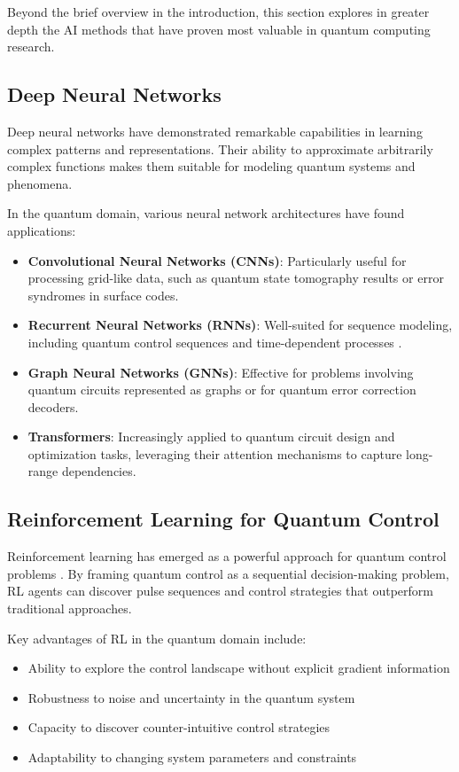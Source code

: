 Beyond the brief overview in the introduction, this section explores in greater depth the AI methods that have proven most valuable in quantum computing research.

\subsection{Deep Neural Networks}
Deep neural networks have demonstrated remarkable capabilities in learning complex patterns and representations. Their ability to approximate arbitrarily complex functions \cite{hornik1989multilayer} makes them suitable for modeling quantum systems and phenomena.

In the quantum domain, various neural network architectures have found applications:
\begin{itemize}
    \item \textbf{Convolutional Neural Networks (CNNs)}: Particularly useful for processing grid-like data, such as quantum state tomography results or error syndromes in surface codes.
    \item \textbf{Recurrent Neural Networks (RNNs)}: Well-suited for sequence modeling, including quantum control sequences and time-dependent processes \cite{banchi2018modelling}.
    \item \textbf{Graph Neural Networks (GNNs)}: Effective for problems involving quantum circuits represented as graphs or for quantum error correction decoders.
    \item \textbf{Transformers}: Increasingly applied to quantum circuit design and optimization tasks, leveraging their attention mechanisms to capture long-range dependencies.
\end{itemize}

\subsection{Reinforcement Learning for Quantum Control}
Reinforcement learning has emerged as a powerful approach for quantum control problems \cite{bukov2018reinforcement}. By framing quantum control as a sequential decision-making problem, RL agents can discover pulse sequences and control strategies that outperform traditional approaches.

Key advantages of RL in the quantum domain include:
\begin{itemize}
    \item Ability to explore the control landscape without explicit gradient information
    \item Robustness to noise and uncertainty in the quantum system
    \item Capacity to discover counter-intuitive control strategies
    \item Adaptability to changing system parameters and constraints
\end{itemize}

